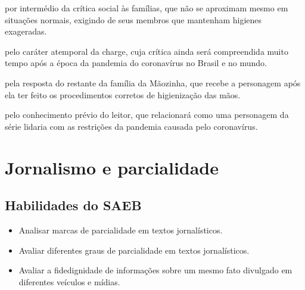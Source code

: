 \begin{escolha}
\item por intermédio da crítica social às famílias, que não se aproximam
mesmo em situações normais, exigindo de seus membros que mantenham
higienes exageradas.

\item pelo caráter atemporal da charge, cuja crítica ainda será
compreendida muito tempo após a época da pandemia do coronavírus no
Brasil e no mundo.

\item pela resposta do restante da família da Mãozinha, que recebe a
personagem após ela ter feito os procedimentos corretos de higienização
das mãos.

\item pelo conhecimento prévio do leitor, que relacionará como uma
personagem da série lidaria com as restrições da pandemia causada pelo
coronavírus.
\end{escolha}


\chapter{Jornalismo e parcialidade}

\section{Habilidades do SAEB}

\begin{itemize}
\item Analisar marcas de parcialidade em textos jornalísticos.

\item Avaliar diferentes graus de parcialidade em textos jornalísticos.

\item Avaliar a fidedignidade de informações sobre um mesmo fato divulgado
em diferentes veículos e mídias.
\end{itemize}

